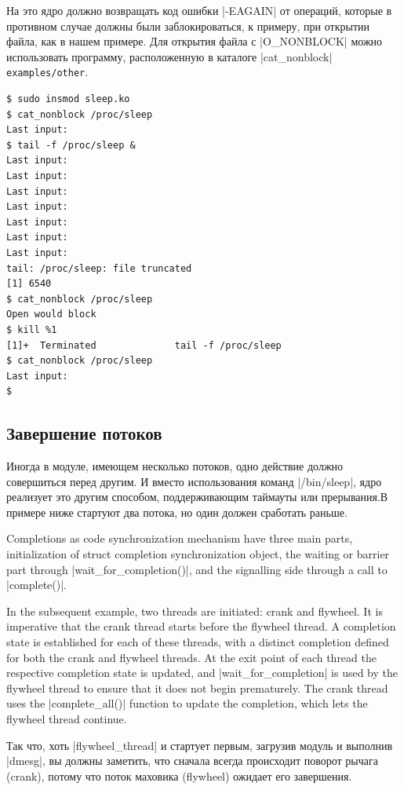 \documentclass[10pt, oneside]{book}
\begin{document}
На это ядро должно возвращать код ошибки \cpp|-EAGAIN| от операций, которые в противном
случае должны были заблокироваться, к примеру, при открытии файла, как в нашем примере. Для открытия файла с \cpp|O_NONBLOCK| можно использовать программу, расположенную в каталоге \sh|cat_nonblock| \verb|examples/other|.

\begin{verbatim}
$ sudo insmod sleep.ko
$ cat_nonblock /proc/sleep
Last input:
$ tail -f /proc/sleep &
Last input:
Last input:
Last input:
Last input:
Last input:
Last input:
Last input:
tail: /proc/sleep: file truncated
[1] 6540
$ cat_nonblock /proc/sleep
Open would block
$ kill %1
[1]+  Terminated              tail -f /proc/sleep
$ cat_nonblock /proc/sleep
Last input:
$
\end{verbatim}



\subsection{Завершение потоков}
\label{sec:completion}
Иногда в модуле, имеющем несколько потоков, одно действие должно совершиться перед другим. И вместо использования команд \sh|/bin/sleep|, ядро реализует это другим способом, поддерживающим таймауты или прерывания.В примере ниже стартуют два потока, но один должен сработать раньше.

Completions as code synchronization mechanism have three main parts, initialization of struct completion synchronization object, the waiting or barrier part through \cpp|wait_for_completion()|, and the signalling side through a call to \cpp|complete()|.

In the subsequent example, two threads are initiated: crank and flywheel. 
It is imperative that the crank thread starts before the flywheel thread. 
A completion state is established for each of these threads, with a distinct completion defined for both the crank and flywheel threads.
At the exit point of each thread the respective completion state is updated, and \cpp|wait_for_completion| is used by the flywheel thread to ensure that it does not begin prematurely.
The crank thread uses the \cpp|complete_all()| function to update the completion, which lets the flywheel thread continue.

Так что, хоть \cpp|flywheel_thread| и стартует первым, загрузив модуль и выполнив \sh|dmesg|, вы должны заметить, что сначала всегда происходит поворот рычага (crank), потому что поток маховика (flywheel) ожидает его завершения.
\end{document}

